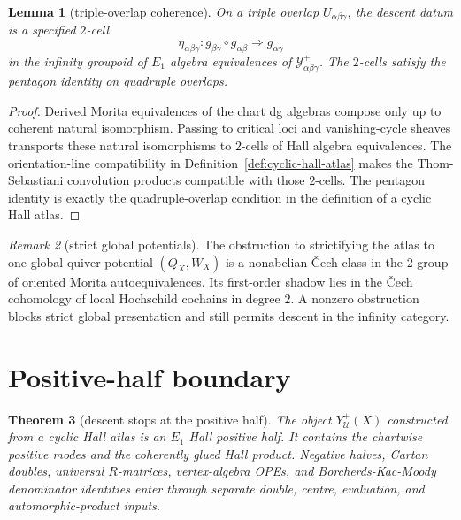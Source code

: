 \documentclass[11pt]{article}
\providecommand{\cU}{\mathcal{U}}
\providecommand{\cY}{\mathcal{Y}}
\newtheorem{theorem}{Theorem}[section]
\newtheorem{lemma}[theorem]{Lemma}
\theoremstyle{definition}
\theoremstyle{remark}
\newtheorem{remark}[theorem]{Remark}
\begin{document}
\begin{lemma}[triple-overlap coherence]\label{lem:triple-coherence}
On a triple overlap $U_{\alpha\beta\gamma}$, the descent datum is a
specified $2$-cell
\[
\eta_{\alpha\beta\gamma}\colon
g_{\beta\gamma}\circ g_{\alpha\beta}
\Longrightarrow
g_{\alpha\gamma}
\]
in the infinity groupoid of $E_1$ algebra equivalences of
$\cY^+_{\alpha\beta\gamma}$. The $2$-cells satisfy the pentagon
identity on quadruple overlaps.
\end{lemma}

\begin{proof}
Derived Morita equivalences of the chart dg algebras compose only up to
coherent natural isomorphism. Passing to critical loci and
vanishing-cycle sheaves transports these natural isomorphisms to
$2$-cells of Hall algebra equivalences. The orientation-line
compatibility in Definition~\ref{def:cyclic-hall-atlas} makes the
Thom-Sebastiani convolution products compatible with those $2$-cells.
The pentagon identity is exactly the quadruple-overlap condition in the
definition of a cyclic Hall atlas.
\end{proof}

\begin{remark}[strict global potentials]\label{rem:strict-global-potential}
The obstruction to strictifying the atlas to one global quiver
potential $(Q_X,W_X)$ is a nonabelian \v{C}ech class in the $2$-group of
oriented Morita autoequivalences. Its first-order shadow lies in the
\v{C}ech cohomology of local Hochschild cochains in degree $2$. A
nonzero obstruction blocks strict global presentation and still permits
descent in the infinity category.
\end{remark}

\section{Positive-half boundary}

\begin{theorem}[descent stops at the positive half]\label{thm:positive-half-boundary}
The object $Y^+_{\cU}(X)$ constructed from a cyclic Hall atlas is an
$E_1$ Hall positive half. It contains the chartwise positive modes and
the coherently glued Hall product. Negative halves, Cartan doubles,
universal $R$-matrices, vertex-algebra OPEs, and Borcherds-Kac-Moody
denominator identities enter through separate double, centre,
evaluation, and automorphic-product inputs.
\end{theorem}
\end{document}
